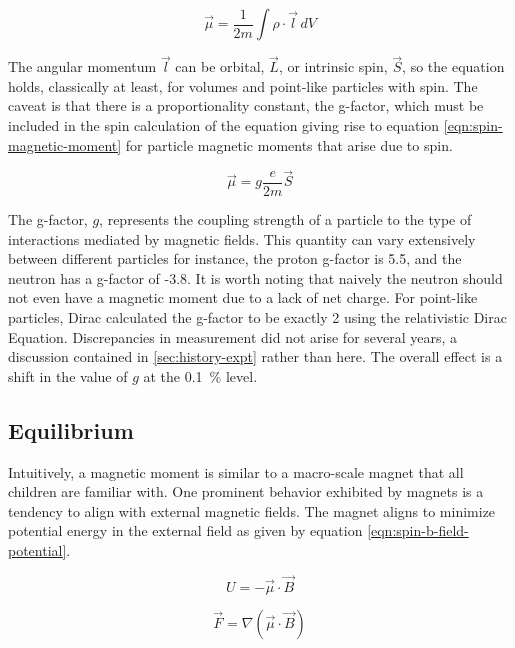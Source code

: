 \begin{equation}
\label{eqn:magnetic-moment-integral-2}
\vec{\mu} = \frac{1}{2 m} \int \rho \cdot \vec{l} \,dV
\end{equation}

The angular momentum $\vec{l}$ can be orbital, $\vec{L}$, or intrinsic spin, $\vec{S}$, so the equation holds, classically at least, for volumes and point-like particles with spin. The caveat is that there is a proportionality constant, the g-factor, which must be included in the spin calculation of the equation giving rise to equation \ref{eqn:spin-magnetic-moment} for particle magnetic moments that arise due to spin.

\begin{equation}
\label{eqn:spin-magnetic-moment}
\vec{\mu} = g \frac{e}{2m}\vec{S}
\end{equation}

\noindent
The g-factor, $g$, represents the coupling strength of a particle to the type of interactions mediated by magnetic fields.  This quantity can vary extensively between different particles for instance, the proton g-factor is 5.5, and the neutron has a g-factor of -3.8\cite{codata}.  It is worth noting that naively the neutron should not even have a magnetic moment due to a lack of net charge.  For point-like particles, Dirac calculated the g-factor to be exactly 2 using the relativistic Dirac Equation.  Discrepancies in measurement did not arise for several years, a discussion contained in \ref{sec:history-expt} rather than here.  The overall effect is a shift in the value of $g$ at the \SI{0.1}{\percent} level.

\subsection{Equilibrium}
Intuitively, a magnetic moment is similar to a macro-scale magnet that all children are familiar with.  One prominent behavior exhibited by magnets is a tendency to align with external magnetic fields.  The magnet aligns to minimize potential energy in the external field as given by equation \ref{eqn:spin-b-field-potential}.

\begin{equation}
\label{eqn:spin-b-field-potential}
U = -\vec{\mu} \cdot \vec{B}
\end{equation}

\begin{equation}
\label{eqn:spin-b-field-force}
\vec{F} = \nabla (\vec{\mu} \cdot \vec{B})
\end{equation}

